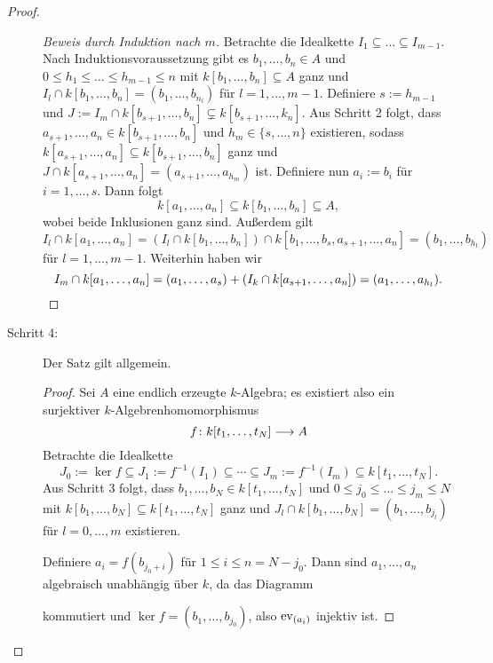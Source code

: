 \documentclass[12pt,a4paper]{scrartcl}
\theoremstyle{cplain}
\theoremstyle{cdef}
\begin{document}
\begin{proof}
\begin{description}
\begin{proof}[Beweis durch Induktion nach $m$]
			Betrachte die Idealkette $I_1\subseteq\dots\subseteq I_{m-1}$. Nach Induktionsvoraussetzung gibt es $b_1,\dots, b_n\in A$ und $0\le h_1\le\dots\le h_{m-1}\le n$ mit $k[b_1,\dots, b_n]\subseteq A$ ganz und $I_l\cap k[b_1,\dots, b_n] = (b_1,\dots, b_{n_l})$ für $l = 1,\dots, m-1$. Definiere $s := h_{m-1}$ und $J := I_m\cap k[b_{s+1},\dots, b_n] \subsetneq k[b_{s+1},\dots, k_n]$. Aus Schritt 2 folgt, dass $a_{s+1}, \dots, a_n\in k[b_{s+1},\dots, b_n]$ und $h_m\in \{s,\dots, n\}$ existieren, sodass $k[a_{s+1},\dots, a_n]\subseteq k[b_{s+1},\dots, b_n]$ ganz und $J\cap k[a_{s+1},\dots, a_n] = (a_{s+1},\dots, a_{h_m})$ ist. Definiere nun $a_i := b_i$ für $i = 1,\dots, s$. Dann folgt
			\[k[a_1,\dots, a_n] \subseteq k[b_1,\dots, b_n]\subseteq A,\]
			wobei beide Inklusionen ganz sind. Außerdem gilt
			\[I_l\cap k[a_1,\dots, a_n] = (I_l\cap k[b_1,\dots, b_n])\cap k[b_1,\dots, b_s, a_{s+1},\dots, a_n] = (b_1,\dots, b_{h_l})\]
			für $l = 1,\dots, m-1$. Weiterhin haben wir 
			\[I_m\cap k[a_1,\dots, a_n] = (a_1,\dots, a_s)+(I_k\cap k[a_{s+1},\dots, a_n]) = (a_1,\dots, a_{h_l}).\qedhere\]
		\end{proof}
		
		\item[Schritt 4:] Der Satz gilt allgemein.
		\begin{proof}
			Sei $A$ eine endlich erzeugte $k$-Algebra; es existiert also ein surjektiver $k$-Algebrenhomomorphismus
			\[f\colon k[t_1,\dots, t_N]\longrightarrow A\]
			Betrachte die Idealkette 
			\[J_0 := \ker f\subseteq J_1 := f^{-1}(I_1)\subseteq \cdots \subseteq J_m := f^{-1}(I_m)\subseteq k[t_1,\dots, t_N].\]
			Aus Schritt 3 folgt, dass $b_1,\dots, b_N\in k[t_1,\dots, t_N]$ und $0\le j_0\le\dots\le j_m\le N$ mit $k[b_1,\dots, b_N]\subseteq k[t_1,\dots, t_N]$ ganz und $J_l\cap k[b_1,\dots, b_N] = (b_1,\dots, b_{j_l})$ für $l = 0,\ldots,m$ existieren.
			
			Definiere $a_i = f(b_{j_0+i})$ für $1\le i \le n = N-j_0$. Dann sind $a_1,\dots, a_n$ algebraisch unabhängig über $k$, da das Diagramm
			\begin{center}
			\end{center}
			kommutiert und $\ker f = (b_1,\dots, b_{j_0})$, also $\operatorname{ev}_{(a_i)}$ injektiv ist.
			

\end{proof}
\end{description}
\end{proof}
\end{document}
